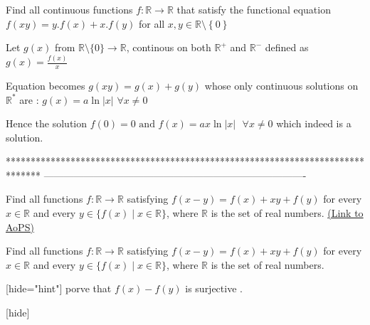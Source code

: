 \begin{solution}
	\begin{tcolorbox}Find  all continuous functions $f : \mathbb{R}\rightarrow \mathbb{R}$ that satisfy the  functional equation 
$ f\left (  xy\right )=y.f\left ( x \right )+x. f\left ( y\right )$   for all $ x,y\in \mathbb{R}\setminus \left \{ 0 \right \}$\end{tcolorbox}
Let $g(x)$ from $\mathbb R\setminus\{0\}\to\mathbb R$, continous on both $\mathbb R^+$ and $\mathbb R^-$ defined as $g(x)=\frac{f(x)}x$

Equation becomes $g(xy)=g(x)+g(y)$ whose only continuous solutions on $\mathbb R^*$ are : $g(x)=a\ln |x|$ $\forall x\ne 0$

Hence the solution $\boxed{f(0)=0\text{ and }f(x)=ax\ln|x|\text{   }\forall x\ne 0}$ which indeed is a solution.
\end{solution}
*******************************************************************************
-------------------------------------------------------------------------------

\begin{problem}
	Find all functions $f:\mathbb{R}\to \mathbb{R}$ satisfying $f(x-y)=f(x)+xy+f(y)$ for every $x \in \mathbb{R}$ and every $y \in \{f(x) \mid x\in \mathbb{R}\}$, where $\mathbb{R}$ is the set of real numbers.
	\flushright \href{https://artofproblemsolving.com/community/c6h591839}{(Link to AoPS)}
\end{problem}



\begin{solution}
	\begin{tcolorbox}Find all functions $f:\mathbb{R}\to \mathbb{R}$ satisfying $f(x-y)=f(x)+xy+f(y)$ for every $x \in \mathbb{R}$ and every $y \in \{f(x) \mid x\in \mathbb{R}\}$, where $\mathbb{R}$ is the set of real numbers.\end{tcolorbox}

[hide="hint"]
porve that $f(x)-f(y)$ is surjective .

[\/hide]
\end{solution}






